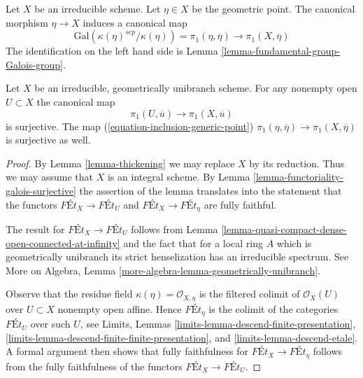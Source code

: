 \noindent
Let $X$ be an irreducible scheme. Let $\eta \in X$ be the geometric
point. The canonical morphism $\eta \to X$ induces a canonical map
\begin{equation}
\label{equation-inclusion-generic-point}
\text{Gal}(\kappa(\eta)^{sep}/\kappa(\eta)) = \pi_1(\eta, \overline{\eta})
\longrightarrow \pi_1(X, \overline{\eta})
\end{equation}
The identification on the left hand side is
Lemma \ref{lemma-fundamental-group-Galois-group}.

\begin{lemma}
\label{lemma-irreducible-geometrically-unibranch}
Let $X$ be an irreducible, geometrically unibranch scheme.
For any nonempty open $U \subset X$ the canonical map
$$
\pi_1(U, \overline{u}) \longrightarrow \pi_1(X, \overline{u})
$$
is surjective. The map (\ref{equation-inclusion-generic-point})
$\pi_1(\eta, \overline{\eta}) \to \pi_1(X, \overline{\eta})$
is surjective as well.
\end{lemma}

\begin{proof}
By Lemma \ref{lemma-thickening} we may replace $X$ by its reduction.
Thus we may assume that $X$ is an integral scheme. By
Lemma \ref{lemma-functoriality-galois-surjective}
the assertion of the lemma translates into the statement that
the functors $\textit{F\'Et}_X \to \textit{F\'Et}_U$ and
$\textit{F\'Et}_X \to \textit{F\'Et}_\eta$ are fully faithful.

\medskip\noindent
The result for $\textit{F\'Et}_X \to \textit{F\'Et}_U$ follows
from Lemma \ref{lemma-quasi-compact-dense-open-connected-at-infinity}
and the fact that for a local ring $A$ which is
geometrically unibranch its strict henselization has an
irreducible spectrum. See
More on Algebra, Lemma \ref{more-algebra-lemma-geometrically-unibranch}.

\medskip\noindent
Observe that the residue field $\kappa(\eta) = \mathcal{O}_{X, \eta}$
is the filtered colimit of $\mathcal{O}_X(U)$ over $U \subset X$
nonempty open affine. Hence $\textit{F\'Et}_\eta$ is the colimit of the
categories $\textit{F\'Et}_U$ over such $U$, see
Limits, Lemmas \ref{limits-lemma-descend-finite-presentation},
\ref{limits-lemma-descend-finite-finite-presentation}, and
\ref{limits-lemma-descend-etale}.
A formal argument then shows that fully faithfulness for
$\textit{F\'Et}_X \to \textit{F\'Et}_\eta$ follows from the
fully faithfulness of the functors $\textit{F\'Et}_X \to \textit{F\'Et}_U$.
\end{proof}








